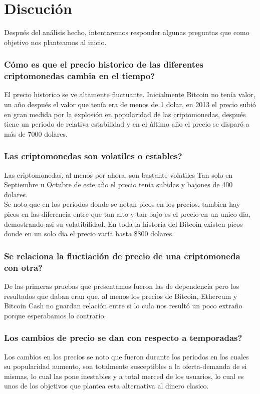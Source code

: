 \documentclass[12pt,letterpaper]{article}
\begin{document}
\section{Discuci\'on}

    Despu\'es del an\'alisis hecho, intentaremos responder algunas preguntas que como objetivo nos planteamos al inicio.

 	\subsubsection*{C\'omo es que el precio historico de las diferentes criptomonedas cambia en el tiempo?}
    El precio historico se ve altamente fluctuante. Inicialmente Bitcoin no ten\'ia valor, un a\~no despu\'es el valor que ten\'ia era de menos de 1 dolar, en 2013 el precio subi\'o en gran medida por la explosi\'on en popularidad de las criptomonedas, despu\'es tiene un periodo de relativa estabilidad y en el \'ultimo a\~no el precio se dispar\'o a m\'as de 7000 dolares.
	
 	\subsubsection*{Las criptomonedas son volatiles o estables?}
	Las criptomonedas, al menos por ahora, son bastante volatiles Tan solo en Septiembre u Octubre de este a\~no el precio ten\'ia subidas y bajones de 400 dolares.
    \\
    Se noto que en los periodos donde se notan picos en los precios, tambien hay picos en las diferencia entre que tan alto y tan bajo es el precio en un unico dia, demostrando asi su volatibilidad. En toda la historia del Bitcoin existen picos donde en un solo dia el precio var\'ia hasta \$800  dolares.

 	\subsubsection*{Se relaciona la fluctiaci\'on de precio de una criptomoneda con otra?}
    De las primeras pruebas que presentamos fueron las de dependenc\'ia pero los resultados que daban eran que, al menos los precios de Bitcoin, Ethereum y Bitcoin Cash no guardan relaci\'on entre si lo cula nos result\'o un poco extra\~no porque esperabamos lo contrario.

	\subsubsection*{Los cambios de precio se dan con respecto a temporadas?}
	Los cambios en los precios se noto que fueron durante los periodos en los cuales su popularidad aumento, son totalmente susceptibles a la oferta-demanda de si mismas, lo cual las pone inestables y a total merced de los usuarios, lo cual es unos de los objetivos que plantea esta alternativa al dinero clasico.
\end{document}
